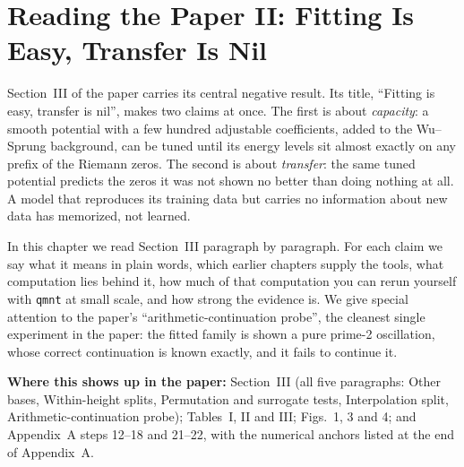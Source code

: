 \chapter{Reading the Paper II: Fitting Is Easy, Transfer Is Nil}\label{ch:paper-memorization}

\begin{chapterintro}
Section~III of the paper \cite{soniR1} carries its central negative result. Its title, ``Fitting is easy, transfer is nil'', makes two claims at once. The first is about \emph{capacity}: a smooth potential with a few hundred adjustable coefficients, added to the Wu--Sprung background, can be tuned until its energy levels sit almost exactly on any prefix of the Riemann zeros. The second is about \emph{transfer}: the same tuned potential predicts the zeros it was not shown no better than doing nothing at all. A model that reproduces its training data but carries no information about new data has memorized, not learned.

In this chapter we read Section~III paragraph by paragraph. For each claim we say what it means in plain words, which earlier chapters supply the tools, what computation lies behind it, how much of that computation you can rerun yourself with \texttt{qmnt} at small scale, and how strong the evidence is. We give special attention to the paper's ``arithmetic-continuation probe'', the cleanest single experiment in the paper: the fitted family is shown a pure prime-2 oscillation, whose correct continuation is known exactly, and it fails to continue it.

\textbf{Where this shows up in the paper:} Section~III (all five paragraphs: Other bases, Within-height splits, Permutation and surrogate tests, Interpolation split, Arithmetic-continuation probe); Tables~I, II and III; Figs.~1, 3 and 4; and Appendix~A steps 12--18 and 21--22, with the numerical anchors listed at the end of Appendix~A.
\end{chapterintro}

